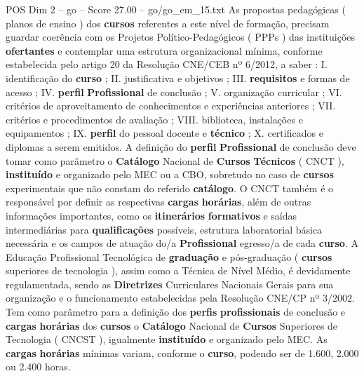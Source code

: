 \begin{textsample}{POS Dim 2 – go – Score 27.00 – go/go\_em\_15.txt}
As propostas pedagógicas ( planos de ensino ) dos \textbf{cursos} referentes a este nível de formação, precisam guardar coerência com os Projetos Político-Pedagógicos ( PPPs ) das instituições \textbf{ofertantes} e contemplar uma estrutura organizacional mínima, conforme estabelecida pelo artigo 20 da Resolução CNE/CEB nº 6/2012, a saber : I. identificação do \textbf{curso} ; II. justificativa e objetivos ; III. \textbf{requisitos} e formas de acesso ; IV. \textbf{perfil} \textbf{Profissional} de conclusão ; V. organização curricular ; VI. critérios de aproveitamento de conhecimentos e experiências anteriores ; VII. critérios e procedimentos de avaliação ; VIII. biblioteca, instalações e equipamentos ; IX. \textbf{perfil} do pessoal docente e \textbf{técnico} ; X. certificados e diplomas a serem emitidos.
A definição do \textbf{perfil} \textbf{Profissional} de conclusão deve tomar como parâmetro o \textbf{Catálogo} Nacional de \textbf{Cursos} \textbf{Técnicos} ( CNCT ), \textbf{instituído} e organizado pelo MEC ou a CBO, sobretudo no caso de \textbf{cursos} experimentais que não constam do referido \textbf{catálogo}.
O CNCT também é o responsável por definir as respectivas \textbf{cargas} \textbf{horárias}, além de outras informações importantes, como os \textbf{itinerários} \textbf{formativos} e saídas intermediárias para \textbf{qualificações} possíveis, estrutura laboratorial básica necessária e os campos de atuação do/a \textbf{Profissional} egresso/a de cada \textbf{curso}.
A Educação Profissional Tecnológica de \textbf{graduação} e pós-graduação ( \textbf{cursos} superiores de tecnologia ), assim como a Técnica de Nível Médio, é devidamente regulamentada, sendo as \textbf{Diretrizes} Curriculares Nacionais Gerais para sua organização e o funcionamento estabelecidas pela Resolução CNE/CP nº 3/2002.
Tem como parâmetro para a definição dos \textbf{perfis} \textbf{profissionais} de conclusão e \textbf{cargas} \textbf{horárias} dos \textbf{cursos} o \textbf{Catálogo} Nacional de \textbf{Cursos} Superiores de Tecnologia ( CNCST ), igualmente \textbf{instituído} e organizado pelo MEC.
As \textbf{cargas} \textbf{horárias} mínimas variam, conforme o \textbf{curso}, podendo ser de 1.600, 2.000 ou 2.400 horas.

\end{textsample}
